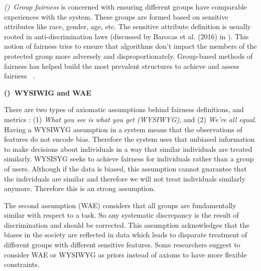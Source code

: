         \textit{()~Group fairness} is concerned with ensuring different groups have comparable experiences with the system. These groups are formed based on sensitive attributes like race, gender, age, etc. The sensitive attribute definition is usually rooted in anti-discrimination laws (discussed by Barocas et al. (2016) in \cite{barocas2016big}). This notion of fairness tries to ensure that algorithms don't impact the members of the protected group more adversely and disproportionately. Group-based methods of fairness has helped build the most prevalent structures to achieve and assess fairness ~\cite{zemel2013learning,kamishima2012fairness,kamiran2010discrimination,zhang2017anti}.
        
        \textbf{()~WYSIWIG and WAE}
        
        There are two types of axiomatic assumptions behind fairness definitions, and metrics \cite{friedler-impossibility-2021}: (1) \textit{What you see is what you get (WYSIWYG)}, and (2) \textit{We're all equal}. Having a WYSIWYG assumption in a system means that the observations of features do not encode bias. Therefore the system uses that unbiased information to make decisions about individuals in a way that similar individuals are treated similarly. WYSISYG seeks to achieve fairness for individuals rather than a group of users. Although if the data is biased, this assumption cannot guarantee that the individuals are similar and therefore we will not treat individuals similarly anymore. Therefore this is an strong assumption. 
        
        The second assumption (WAE) considers that all groups are fundamentally similar with respect to a task. So any systematic discrepancy is the result of discrimination and should be corrected. This assumption acknowledges that the biases in the society are reflected in data which leads to disparate treatment of different groups with different sensitive features. Some researchers suggest to consider WAE or WYSIWYG as priors instead of axioms to have more flexible constraints.
        
        
        
